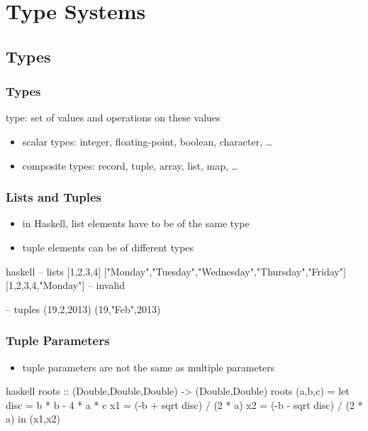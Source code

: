 \documentclass[dvipsnames]{beamer}
\theoremstyle{plain}
\begin{document}
\section{Type Systems}

\subsection{Types}

\begin{frame}
  \frametitle{Types}

  \begin{definition}
    \alert{type}: set of values and operations on these values
  \end{definition}

  \pause
  \medskip
  \begin{itemize}
    \item scalar types: integer, floating-point, boolean, character, \ldots
    \item composite types: record, tuple, array, list, map, \ldots
  \end{itemize}
\end{frame}

\begin{frame}[fragile]
  \frametitle{Lists and Tuples}

  \begin{itemize}
    \item in Haskell, list elements have to be of the same type
    \item tuple elements can be of different types
  \end{itemize}

  \begin{example}[Haskell]
    \begin{pygments}{haskell}
-- lists
[1,2,3,4]
["Monday","Tuesday","Wednesday","Thursday","Friday"]
[1,2,3,4,"Monday"]      -- invalid

-- tuples
(19,2,2013)
(19,"Feb",2013)
    \end{pygments}
  \end{example}
\end{frame}

\begin{frame}[fragile]
  \frametitle{Tuple Parameters}

  \begin{itemize}
    \item tuple parameters are not the same as multiple parameters
  \end{itemize}

  \begin{example}[Haskell]
    \begin{pygments}{haskell}
roots :: (Double,Double,Double) -> (Double,Double)
roots (a,b,c) =
    let
        disc = b * b - 4 * a * c
        x1 = (-b + sqrt disc) / (2 * a)
        x2 = (-b - sqrt disc) / (2 * a)
    in
        (x1,x2)
    \end{pygments}
  \end{example}
\end{frame}
\end{document}
